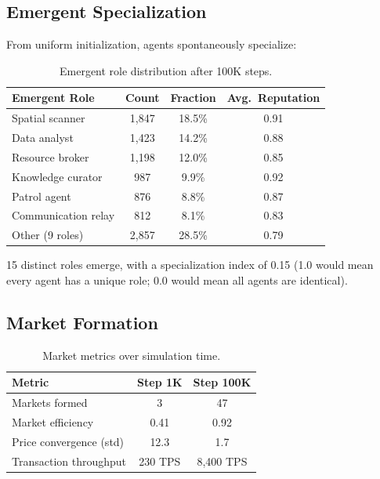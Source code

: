\documentclass[11pt,letterpaper]{article}
\begin{document}
\subsection{Emergent Specialization}

From uniform initialization, agents spontaneously specialize:

\begin{table}[t]
\centering
\begin{tabular}{lccc}
\toprule
\textbf{Emergent Role} & \textbf{Count} & \textbf{Fraction} & \textbf{Avg.\ Reputation} \\
\midrule
Spatial scanner & 1,847 & 18.5\% & 0.91 \\
Data analyst & 1,423 & 14.2\% & 0.88 \\
Resource broker & 1,198 & 12.0\% & 0.85 \\
Knowledge curator & 987 & 9.9\% & 0.92 \\
Patrol agent & 876 & 8.8\% & 0.87 \\
Communication relay & 812 & 8.1\% & 0.83 \\
Other (9 roles) & 2,857 & 28.5\% & 0.79 \\
\bottomrule
\end{tabular}
\caption{Emergent role distribution after 100K steps.}
\label{tab:roles}
\end{table}

15 distinct roles emerge, with a specialization index of 0.15 (1.0 would mean every agent has a unique role; 0.0 would mean all agents are identical).

\subsection{Market Formation}

\begin{table}[t]
\centering
\begin{tabular}{lcc}
\toprule
\textbf{Metric} & \textbf{Step 1K} & \textbf{Step 100K} \\
\midrule
Markets formed & 3 & 47 \\
Market efficiency & 0.41 & 0.92 \\
Price convergence (std) & 12.3 & 1.7 \\
Transaction throughput & 230 TPS & 8,400 TPS \\
\bottomrule
\end{tabular}
\caption{Market metrics over simulation time.}
\label{tab:markets}
\end{table}
\end{document}
